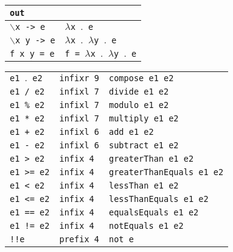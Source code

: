 \begin{table}[H]
\begin{center}
\begin{tabularx}{\textwidth}{|p{16em}|X|}
            \texttt{out}                     &                                                                  \\
            \hline
            \texttt{$\backslash$x -> e}      & \texttt{$\lambda$x $\mathord{.}$ e}                              \\
            \hline
            \texttt{$\backslash$x y -> e}    & \texttt{$\lambda$x $\mathord{.}$ $\lambda$y $\mathord{.}$ e}     \\
            \hline
            \texttt{f x y = e}               & \texttt{f = $\lambda$x $\mathord{.}$ $\lambda$y $\mathord{.}$ e} \\
            \hline
        \end{tabularx}
        \begin{tabularx}{\textwidth}{|p{8em}@{\quad}p{7em}|X|}
            \texttt{e1 $\mathord{.}$ e2} & \texttt{infixr 9} & \texttt{compose e1 e2}            \\
            \texttt{e1 / e2}             & \texttt{infixl 7} & \texttt{divide e1 e2}             \\
            \texttt{e1 \% e2}            & \texttt{infixl 7} & \texttt{modulo e1 e2}             \\
            \texttt{e1 * e2}             & \texttt{infixl 7} & \texttt{multiply e1 e2}           \\
            \texttt{e1 + e2}             & \texttt{infixl 6} & \texttt{add e1 e2}                \\
            \texttt{e1 - e2}             & \texttt{infixl 6} & \texttt{subtract e1 e2}           \\
            \texttt{e1 > e2}             & \texttt{infix 4}  & \texttt{greaterThan e1 e2}        \\
            \texttt{e1 >= e2}            & \texttt{infix 4}  & \texttt{greaterThanEquals e1 e2}  \\
            \texttt{e1 < e2}             & \texttt{infix 4}  & \texttt{lessThan e1 e2}           \\
            \texttt{e1 <= e2}            & \texttt{infix 4}  & \texttt{lessThanEquals e1 e2}     \\
            \texttt{e1 == e2}            & \texttt{infix 4}  & \texttt{equalsEquals e1 e2}       \\
            \texttt{e1 != e2}            & \texttt{infix 4}  & \texttt{notEquals e1 e2}          \\
            \texttt{!!e}                 & \texttt{prefix 4} & \texttt{not e}                    \\

\end{tabularx}
\end{center}
\end{table}

